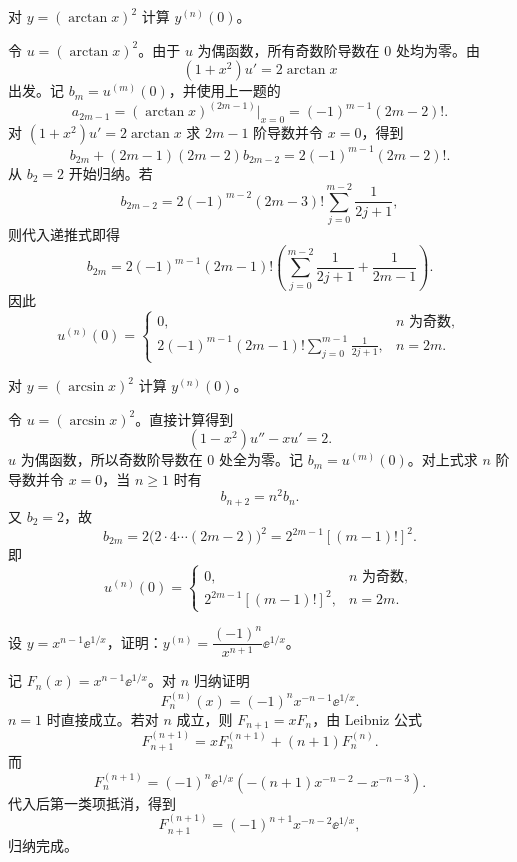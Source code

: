 \begin{xexercise}[2]
对 $y=(\arctan x)^2$ 计算 $y^{(n)}(0)$。
\end{xexercise}
\begin{xsolution}
令 $u=(\arctan x)^2$。由于 $u$ 为偶函数，所有奇数阶导数在 $0$ 处均为零。由
\[
  (1+x^2)u'=2\arctan x
\]
出发。记 $b_m=u^{(m)}(0)$，并使用上一题的
\[
  a_{2m-1}=(\arctan x)^{(2m-1)}\big|_{x=0}
  =(-1)^{m-1}(2m-2)!.
\]
对 $(1+x^2)u'=2\arctan x$ 求 $2m-1$ 阶导数并令 $x=0$，得到
\[
  b_{2m}+(2m-1)(2m-2)b_{2m-2}
  =2(-1)^{m-1}(2m-2)!.
\]
从 $b_2=2$ 开始归纳。若
\[
  b_{2m-2}=2(-1)^{m-2}(2m-3)!
  \sum_{j=0}^{m-2}\frac1{2j+1},
\]
则代入递推式即得
\[
  b_{2m}=2(-1)^{m-1}(2m-1)!
  \left(\sum_{j=0}^{m-2}\frac1{2j+1}+\frac1{2m-1}\right).
\]
因此
\[
  \boxed{
  u^{(n)}(0)=
  \begin{cases}
    0,&n\text{ 为奇数},\\[3pt]
    \displaystyle 2(-1)^{m-1}(2m-1)!\sum_{j=0}^{m-1}\frac1{2j+1},&n=2m.
  \end{cases}}
\]
\end{xsolution}


\begin{xexercise}[3]
对 $y=(\arcsin x)^2$ 计算 $y^{(n)}(0)$。
\end{xexercise}
\begin{xsolution}
令 $u=(\arcsin x)^2$。直接计算得到
\[
  (1-x^2)u''-xu'=2.
\]
$u$ 为偶函数，所以奇数阶导数在 $0$ 处全为零。记 $b_m=u^{(m)}(0)$。对上式求 $n$ 阶导数并令 $x=0$，当 $n\ge1$ 时有
\[
  b_{n+2}=n^2b_n.
\]
又 $b_2=2$，故
\[
  b_{2m}=2\bigl(2\cdot4\cdots(2m-2)\bigr)^2
  =2^{2m-1}[(m-1)!]^2.
\]
即
\[
  \boxed{
  u^{(n)}(0)=
  \begin{cases}
    0,&n\text{ 为奇数},\\
    2^{2m-1}[(m-1)!]^2,&n=2m.
  \end{cases}}
\]
\end{xsolution}


\begin{xexercise}[4]
设 $y=x^{n-1}\ee^{1/x}$，证明：$y^{(n)}=\dfrac{(-1)^n}{x^{n+1}}\ee^{1/x}$。
\end{xexercise}
\begin{xsolution}
记 $F_n(x)=x^{n-1}\ee^{1/x}$。对 $n$ 归纳证明
\[
  F_n^{(n)}(x)=(-1)^nx^{-n-1}\ee^{1/x}.
\]
$n=1$ 时直接成立。若对 $n$ 成立，则 $F_{n+1}=xF_n$，由 Leibniz 公式
\[
  F_{n+1}^{(n+1)}=xF_n^{(n+1)}+(n+1)F_n^{(n)}.
\]
而
\[
  F_n^{(n+1)}=(-1)^n\ee^{1/x}
  \left(-(n+1)x^{-n-2}-x^{-n-3}\right).
\]
代入后第一类项抵消，得到
\[
  F_{n+1}^{(n+1)}=(-1)^{n+1}x^{-n-2}\ee^{1/x},
\]
归纳完成。
\end{xsolution}


